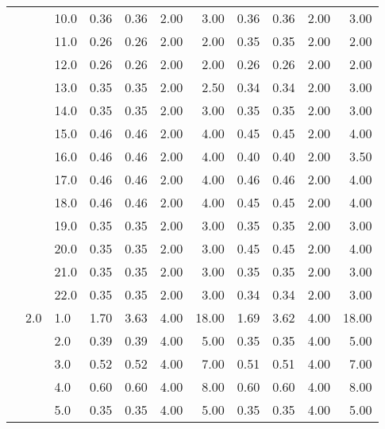 \begin{tabular}{lllrrrrrrrr}
       &     & 10.0 &       0.36 &      0.36 & 2.00 &   3.00 &       0.36 &      0.36 & 2.00 &   3.00 \\
       &     & 11.0 &       0.26 &      0.26 & 2.00 &   2.00 &       0.35 &      0.35 & 2.00 &   2.00 \\
       &     & 12.0 &       0.26 &      0.26 & 2.00 &   2.00 &       0.26 &      0.26 & 2.00 &   2.00 \\
       &     & 13.0 &       0.35 &      0.35 & 2.00 &   2.50 &       0.34 &      0.34 & 2.00 &   3.00 \\
       &     & 14.0 &       0.35 &      0.35 & 2.00 &   3.00 &       0.35 &      0.35 & 2.00 &   3.00 \\
       &     & 15.0 &       0.46 &      0.46 & 2.00 &   4.00 &       0.45 &      0.45 & 2.00 &   4.00 \\
       &     & 16.0 &       0.46 &      0.46 & 2.00 &   4.00 &       0.40 &      0.40 & 2.00 &   3.50 \\
       &     & 17.0 &       0.46 &      0.46 & 2.00 &   4.00 &       0.46 &      0.46 & 2.00 &   4.00 \\
       &     & 18.0 &       0.46 &      0.46 & 2.00 &   4.00 &       0.45 &      0.45 & 2.00 &   4.00 \\
       &     & 19.0 &       0.35 &      0.35 & 2.00 &   3.00 &       0.35 &      0.35 & 2.00 &   3.00 \\
       &     & 20.0 &       0.35 &      0.35 & 2.00 &   3.00 &       0.45 &      0.45 & 2.00 &   4.00 \\
       &     & 21.0 &       0.35 &      0.35 & 2.00 &   3.00 &       0.35 &      0.35 & 2.00 &   3.00 \\
       &     & 22.0 &       0.35 &      0.35 & 2.00 &   3.00 &       0.34 &      0.34 & 2.00 &   3.00 \\
       & 2.0 & 1.0  &       1.70 &      3.63 & 4.00 &  18.00 &       1.69 &      3.62 & 4.00 &  18.00 \\
       &     & 2.0  &       0.39 &      0.39 & 4.00 &   5.00 &       0.35 &      0.35 & 4.00 &   5.00 \\
       &     & 3.0  &       0.52 &      0.52 & 4.00 &   7.00 &       0.51 &      0.51 & 4.00 &   7.00 \\
       &     & 4.0  &       0.60 &      0.60 & 4.00 &   8.00 &       0.60 &      0.60 & 4.00 &   8.00 \\
       &     & 5.0  &       0.35 &      0.35 & 4.00 &   5.00 &       0.35 &      0.35 & 4.00 &   5.00 \\

\end{tabular}
